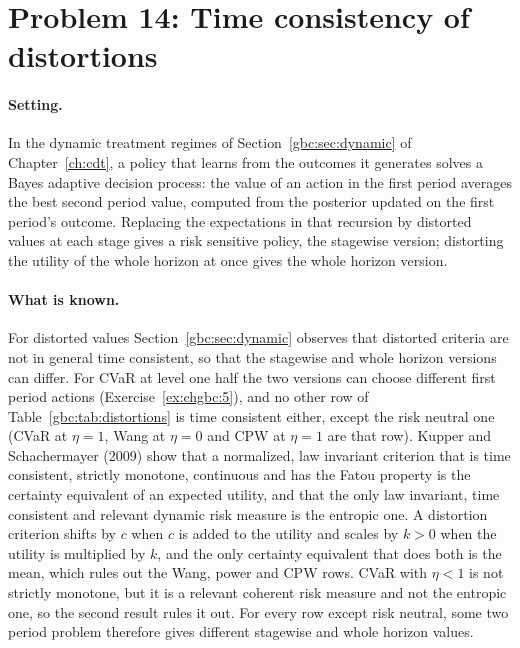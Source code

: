 \section{Problem 14: Time consistency of distortions}

\paragraph{Setting.} In the dynamic treatment regimes of Section~\ref{gbc:sec:dynamic} of Chapter~\ref{ch:cdt}, a policy that learns from the outcomes it generates solves a Bayes adaptive decision process: the value of an action in the first period averages the best second period value, computed from the posterior updated on the first period's outcome. Replacing the expectations in that recursion by distorted values at each stage gives a risk sensitive policy, the stagewise version; distorting the utility of the whole horizon at once gives the whole horizon version.

\paragraph{What is known.}  For distorted values Section~\ref{gbc:sec:dynamic} observes that distorted criteria are not in general time consistent, so that the stagewise and whole horizon versions can differ. For CVaR at level one half the two versions can choose different first period actions (Exercise~\ref{ex:chgbc:5}), and no other row of Table~\ref{gbc:tab:distortions} is time consistent either, except the risk neutral one (CVaR at $\eta = 1$, Wang at $\eta = 0$ and CPW at $\eta = 1$ are that row). Kupper and Schachermayer (2009) show that a normalized, law invariant criterion that is time consistent, strictly monotone, continuous and has the Fatou property is the certainty equivalent of an expected utility, and that the only law invariant, time consistent and relevant dynamic risk measure is the entropic one. A distortion criterion shifts by $c$ when $c$ is added to the utility and scales by $k > 0$ when the utility is multiplied by $k$, and the only certainty equivalent that does both is the mean, which rules out the Wang, power and CPW rows. CVaR with $\eta < 1$ is not strictly monotone, but it is a relevant coherent risk measure and not the entropic one, so the second result rules it out. For every row except risk neutral, some two period problem therefore gives different stagewise and whole horizon values.

